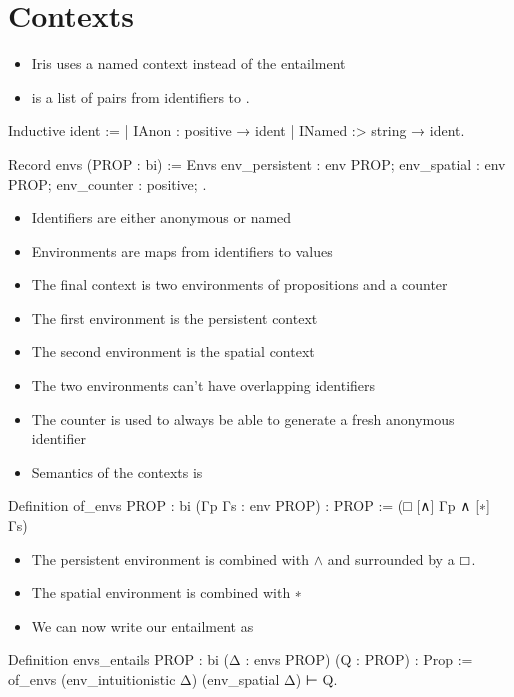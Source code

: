 \documentclass[thesis.tex]{subfiles}
\begin{document}
\section{Contexts}
\begin{itemize}
  \item Iris uses a named context instead of the entailment
  \item {} is a list of pairs from identifiers to .
\end{itemize}
\begin{coqcode}
  Inductive ident :=
    | IAnon : positive → ident
    | INamed :> string → ident.

  Record envs (PROP : bi) := Envs {
    env_persistent : env PROP;
    env_spatial : env PROP;
    env_counter : positive;
  }.
\end{coqcode}
\begin{itemize}
  \item Identifiers are either anonymous or named
  \item Environments are maps from identifiers to values
  \item The final context is two environments of propositions and a counter
  \item The first environment is the persistent context
  \item The second environment is the spatial context
  \item The two environments can't have overlapping identifiers
  \item The counter is used to always be able to generate a fresh anonymous identifier
  \item Semantics of the contexts is
\end{itemize}
\begin{coqcode}
  Definition of_envs {PROP : bi} 
      (Γp Γs : env PROP) : PROP :=
    (□ [∧] Γp ∧ [∗] Γs)%
\end{coqcode}
\begin{itemize}
  \item The persistent environment is combined with $\land$ and surrounded by a $\mathop{\boxempty}$.
  \item The spatial environment is combined with ∗
  \item We can now write our entailment as
\end{itemize}
\begin{coqcode}
  Definition envs_entails {PROP : bi} 
      (Δ : envs PROP) (Q : PROP) : Prop :=
    of_envs (env_intuitionistic Δ) (env_spatial Δ) ⊢ Q.
\end{coqcode}
\end{document}
